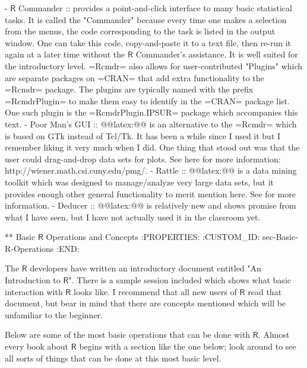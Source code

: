 - \(\mathsf{R}\) Commander :: provides a point-and-click interface to
     many basic statistical tasks. It is called the "Commander"
     because every time one makes a selection from the menus, the code
     corresponding to the task is listed in the output window. One can
     take this code, copy-and-paste it to a text file, then re-run it
     again at a later time without the \(\mathsf{R}\) Commander's
     assistance. It is well suited for the introductory level. =Rcmdr=
     \cite{Rcmdr} also allows for user-contributed "Plugins" which are
     separate packages on =CRAN= that add extra functionality to the
     =Rcmdr= package. The plugins are typically named with the prefix
     =RcmdrPlugin= to make them easy to identify in the =CRAN= package
     list. One such plugin is the =RcmdrPlugin.IPSUR= package
     \cite{RcmdrPlugin.IPSUR} which accompanies this text.
- Poor Man's GUI :: @@latex:@@ is an alternative
                    to the =Rcmdr= which is based on GTk instead of
                    Tcl/Tk. It has been a while since I used it but I
                    remember liking it very much when I did. One thing
                    that stood out was that the user could
                    drag-and-drop data sets for plots. See here for
                    more information:
                    http://wiener.math.csi.cuny.edu/pmg/.
- Rattle :: @@latex:@@ is a data mining toolkit which
            was designed to manage/analyze very large data sets, but
            it provides enough other general functionality to merit
            mention here. See \cite{rattle} for more information.
- Deducer :: @@latex:@@ is relatively new and shows
             promise from what I have seen, but I have not actually
             used it in the classroom yet.

** Basic \(\mathsf{R}\) Operations and Concepts
:PROPERTIES:
:CUSTOM_ID: sec-Basic-R-Operations
:END:

The \(\mathsf{R}\) developers have written an introductory document
entitled "An Introduction to \(\mathsf{R}\)". There is a sample
session included which shows what basic interaction with
\(\mathsf{R}\) looks like. I recommend that all new users of
\(\mathsf{R}\) read that document, but bear in mind that there are
concepts mentioned which will be unfamiliar to the beginner.

Below are some of the most basic operations that can be done with
\(\mathsf{R}\). Almost every book about \(\mathsf{R}\) begins with a
section like the one below; look around to see all sorts of things
that can be done at this most basic level.

